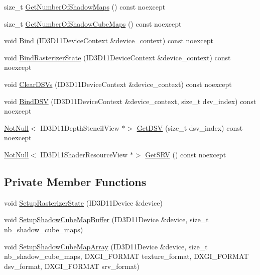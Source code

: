\begin{DoxyCompactItemize}
\item 
size\+\_\+t \mbox{\hyperlink{classmage_1_1rendering_1_1_shadow_cube_map_buffer_a491b9a0306748de68b2cb391e572cb7d}{Get\+Number\+Of\+Shadow\+Maps}} () const noexcept
\item 
size\+\_\+t \mbox{\hyperlink{classmage_1_1rendering_1_1_shadow_cube_map_buffer_a6641e56d3f586ab2cdc74d26b8877168}{Get\+Number\+Of\+Shadow\+Cube\+Maps}} () const noexcept
\item 
void \mbox{\hyperlink{classmage_1_1rendering_1_1_shadow_cube_map_buffer_a584f753f82c2378a8c7171bdf5a96999}{Bind}} (I\+D3\+D11\+Device\+Context \&device\+\_\+context) const noexcept
\item 
void \mbox{\hyperlink{classmage_1_1rendering_1_1_shadow_cube_map_buffer_aa206227920ac298eb4dcfdc8e662663d}{Bind\+Rasterizer\+State}} (I\+D3\+D11\+Device\+Context \&device\+\_\+context) const noexcept
\item 
void \mbox{\hyperlink{classmage_1_1rendering_1_1_shadow_cube_map_buffer_a31df46f6fe89cbaedb7f256ab7ecf514}{Clear\+D\+S\+Vs}} (I\+D3\+D11\+Device\+Context \&device\+\_\+context) const noexcept
\item 
void \mbox{\hyperlink{classmage_1_1rendering_1_1_shadow_cube_map_buffer_ad64e3c0b0c537e4e3f6b301fefb5c60a}{Bind\+D\+SV}} (I\+D3\+D11\+Device\+Context \&device\+\_\+context, size\+\_\+t dsv\+\_\+index) const noexcept
\item 
\mbox{\hyperlink{namespacemage_a8769f9d670d6b585ea306cb1062af94b}{Not\+Null}}$<$ I\+D3\+D11\+Depth\+Stencil\+View $\ast$$>$ \mbox{\hyperlink{classmage_1_1rendering_1_1_shadow_cube_map_buffer_a244e06f9f499496fe721af7f1bd2ea5f}{Get\+D\+SV}} (size\+\_\+t dsv\+\_\+index) const noexcept
\item 
\mbox{\hyperlink{namespacemage_a8769f9d670d6b585ea306cb1062af94b}{Not\+Null}}$<$ I\+D3\+D11\+Shader\+Resource\+View $\ast$$>$ \mbox{\hyperlink{classmage_1_1rendering_1_1_shadow_cube_map_buffer_a2586fb38441a14c38045bc3b6a940161}{Get\+S\+RV}} () const noexcept
\end{DoxyCompactItemize}
\subsection*{Private Member Functions}
\begin{DoxyCompactItemize}
\item 
void \mbox{\hyperlink{classmage_1_1rendering_1_1_shadow_cube_map_buffer_a65d31b9a335e6c27c8d4d6e0127029b2}{Setup\+Rasterizer\+State}} (I\+D3\+D11\+Device \&device)
\item 
void \mbox{\hyperlink{classmage_1_1rendering_1_1_shadow_cube_map_buffer_a4b6e895628905a9ddbaccfafb6a1d5b6}{Setup\+Shadow\+Cube\+Map\+Buffer}} (I\+D3\+D11\+Device \&device, size\+\_\+t nb\+\_\+shadow\+\_\+cube\+\_\+maps)
\item 
void \mbox{\hyperlink{classmage_1_1rendering_1_1_shadow_cube_map_buffer_ac800b8fde94ee7527ce09370b4f9e44a}{Setup\+Shadow\+Cube\+Map\+Array}} (I\+D3\+D11\+Device \&device, size\+\_\+t nb\+\_\+shadow\+\_\+cube\+\_\+maps, D\+X\+G\+I\+\_\+\+F\+O\+R\+M\+AT texture\+\_\+format, D\+X\+G\+I\+\_\+\+F\+O\+R\+M\+AT dsv\+\_\+format, D\+X\+G\+I\+\_\+\+F\+O\+R\+M\+AT srv\+\_\+format)
\end{DoxyCompactItemize}

